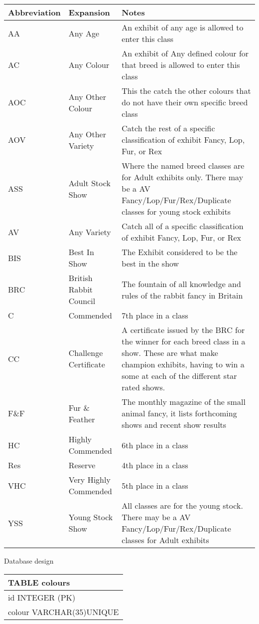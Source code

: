 \documentclass[a4paper,11pt]{report}
\begin{document}
\begin{tabular}{|l|l| p{7cm}| } \hline
\label{table of Abbreviations used}
Abbreviation  & Expansion & Notes \\     \hline
AA& Any Age & An exhibit of any age is allowed to enter this class  \\ \hline
AC  & Any Colour & An exhibit of Any defined colour for that breed is allowed to enter this class \\ \hline
AOC  & Any Other Colour & This the catch the other colours that do not have their own specific breed class \\ \hline
AOV  & Any Other Variety & Catch the rest of a specific classification of exhibit Fancy, Lop, Fur, or Rex \\ \hline
ASS & Adult Stock Show & Where the named breed classes are for Adult exhibits only. There may be a AV Fancy/Lop/Fur/Rex/Duplicate classes for young stock exhibits\\ \hline
AV  & Any Variety & Catch all of a specific classification of exhibit Fancy, Lop, Fur, or Rex\\ \hline
BIS  & Best In Show&The Exhibit considered to be the best in the show \\ \hline
BRC & British Rabbit Council & The fountain of all knowledge and rules of the rabbit fancy in Britain  \\ \hline
C  & Commended& 7th place in a class \\ \hline
CC  & Challenge Certificate & A certificate issued by the BRC for the winner for each breed class in a show. These are what make champion exhibits, having to win a some at each of the different star rated shows.\\ \hline
F\&F & Fur \& Feather & The monthly magazine of the small animal fancy, it lists forthcoming shows and recent show results \\ \hline 
HC & Highly Commended& 6th place in a class \\ \hline
Res & Reserve & 4th place in a class \\ \hline
VHC & Very Highly Commended& 5th place in a class \\ \hline
YSS  & Young Stock Show & All classes are for the young stock. There may be a AV Fancy/Lop/Fur/Rex/Duplicate classes for Adult exhibits \\ \hline 
\end{tabular}
\newpage
Database design \newline \newline
\begin{tabular}{|p{15cm}|} \hline 
TABLE colours \\ \hline 
id INTEGER (PK)\\ 
colour VARCHAR(35)UNIQUE \\ \hline
\end{tabular}\newline
\end{document}
